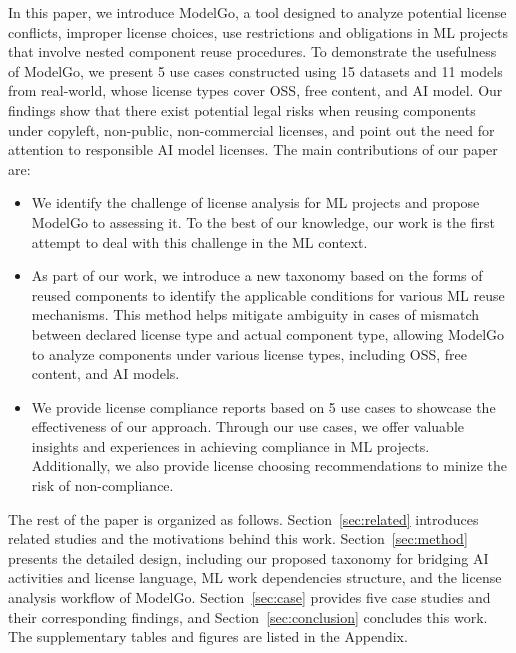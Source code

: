 In this paper, we introduce ModelGo, a tool designed to analyze potential license conflicts, improper license choices, use restrictions and obligations in ML projects that involve nested component reuse procedures.
To demonstrate the usefulness of ModelGo, we present 5 use cases constructed using 15 datasets and 11 models from real-world, whose license types cover OSS, free content, and AI model.
Our findings show that there exist potential legal risks when reusing  components under copyleft, non-public, non-commercial licenses, and point out the need for attention to responsible AI model licenses.
The main contributions of our paper are:
\begin{itemize}%
    \item We identify the challenge of license analysis for ML projects and propose ModelGo to assessing it. To the best of our knowledge, our work is the first attempt to deal with this challenge in the ML context.
    \item As part of our work, we introduce a new taxonomy based on the forms of reused components to identify the applicable conditions for various ML reuse mechanisms. This method helps mitigate ambiguity in cases of mismatch between declared license type and actual component type, allowing ModelGo to analyze components under various license types, including OSS, free content, and AI models.
    \item  We provide license compliance reports based on 5 use cases to showcase the effectiveness of our approach. 
    Through our use cases, we offer valuable insights and experiences in achieving compliance in ML projects. 
    Additionally, we also provide license choosing recommendations to minize the risk of non-compliance.
\end{itemize}

The rest of the paper is organized as follows.
Section~\ref{sec:related} introduces related studies and the motivations behind this work.
Section~\ref{sec:method} presents the detailed design, including our proposed taxonomy for bridging AI activities and license language, ML work dependencies structure, and the license analysis workflow of ModelGo.
Section~\ref{sec:case} provides five case studies and their corresponding findings, and Section~\ref{sec:conclusion} concludes this work.
The supplementary tables and figures are listed in the Appendix.


